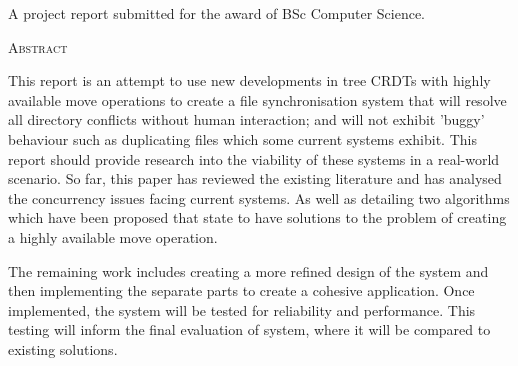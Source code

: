 \documentclass[12pt]{article}
\begin{document}
\begin{titlepage}


    \vfill\vfill\vfill\vfill %

    A project report submitted for the award of BSc Computer Science.





    \vfill %

\end{titlepage}


\newpage
\begin{center}
    \textsc{\large Abstract}
\end{center}

This report is an attempt to use new developments in tree CRDTs with highly available move operations to create a file synchronisation system that will resolve all directory conflicts without human interaction; and will not exhibit 'buggy' behaviour such as duplicating files which some current systems exhibit. This report should provide research into the viability of these systems in a real-world scenario. So far, this paper has reviewed the existing literature and has analysed the concurrency issues facing current systems. As well as detailing two algorithms which have been proposed that state to have solutions to the problem of creating a highly available move operation. \par
The remaining work includes creating a more refined design of the system and then implementing the separate parts to create a cohesive application. Once implemented, the system will be tested for reliability and performance. This testing will inform the final evaluation of system, where it will be compared to existing solutions.
\end{document}
